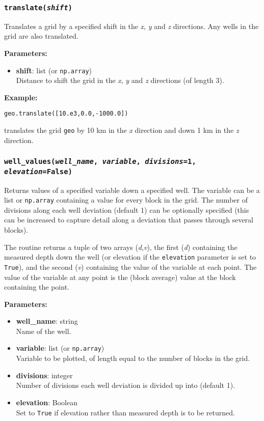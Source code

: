 \subsubsection{\texttt{translate(\emph{shift})}}

Translates a grid by a specified shift in the \emph{x}, \emph{y} and \emph{z} directions.  Any wells in the grid are also translated.

\textbf{Parameters:}
\begin{itemize}
  \item \textbf{shift}: list (or \texttt{np.array})\\
    Distance to shift the grid in the \emph{x}, \emph{y} and \emph{z} directions (of length 3).
\end{itemize}

\textbf{Example:}

\begin{verbatim}
geo.translate([10.e3,0.0,-1000.0])
\end{verbatim}

translates the grid \texttt{geo} by 10 km in the \emph{x} direction and down 1 km in the \emph{z} direction.

\subsubsection{\texttt{well\_values(\emph{well\_name}, \emph{variable}, \emph{divisions}=1, \emph{elevation}=\texttt{False})}}

Returns values of a specified variable down a specified well.  The variable can be a list or \texttt{np.array} containing a value for every block in the grid.  The number of divisions along each well deviation (default 1) can be optionally specified (this can be increased to capture detail along a deviation that passes through several blocks).

The routine returns a tuple of two arrays (\emph{d},\emph{v}), the first (\emph{d}) containing the measured depth down the well (or elevation if the \texttt{elevation} parameter is set to \texttt{True}), and the second (\emph{v}) containing the value of the variable at each point.  The value of the variable at any point is the (block average) value at the block containing the point.

\textbf{Parameters:}
\begin{itemize}
\item \textbf{well\_name}: string\\
  Name of the well.
\item \textbf{variable}: list (or \texttt{np.array})\\
  Variable to be plotted, of length equal to the number of blocks in the grid.
\item \textbf{divisions}: integer\\
  Number of divisions each well deviation is divided up into (default 1).
\item \textbf{elevation}: Boolean\\
  Set to \texttt{True} if elevation rather than measured depth is to be returned.
\end{itemize}

